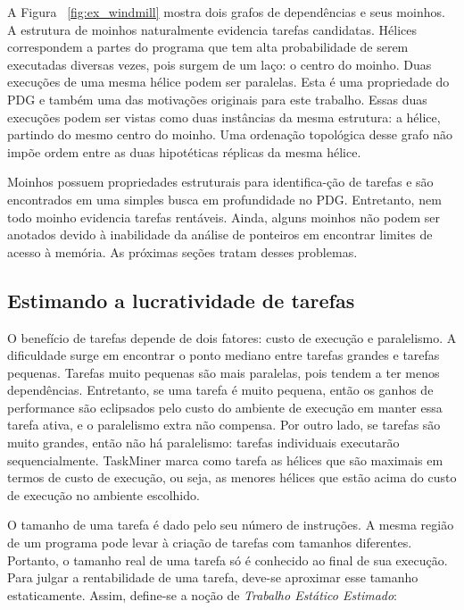\documentclass[sigconf]{acmart}
\newcommand\Taskminer{\mbox{\textsf{TaskMiner}}}
\begin{document}
A Figura ~\ref{fig:ex_windmill} mostra dois grafos de dependências e seus
moinhos. A estrutura de moinhos naturalmente evidencia tarefas candidatas.
Hélices correspondem a partes do programa que tem alta probabilidade de serem
executadas diversas vezes, pois surgem de um laço: o centro do moinho. Duas execuções
de uma mesma hélice podem ser paralelas. Esta é uma propriedade do PDG e também uma 
das motivações originais para este trabalho. Essas duas execuções podem ser vistas como duas instâncias
da mesma estrutura: a hélice, partindo do mesmo centro do moinho. 
Uma ordenação topológica desse grafo não impõe
ordem entre as duas hipotéticas réplicas da mesma hélice.

Moinhos possuem propriedades estruturais para identifica-\c{c}\~{a}o de tarefas e são encontrados
em uma simples busca em profundidade no PDG. Entretanto, nem todo moinho
evidencia tarefas rentáveis. Ainda, alguns moinhos não podem ser anotados devido à inabilidade 
da análise de ponteiros em encontrar limites de acesso à memória. As próximas seções tratam desses
problemas.

\subsection{Estimando a lucratividade de tarefas}
\label{sub:profit}

O benefício de tarefas depende de dois fatores: custo de execução e paralelismo.
A dificuldade surge em encontrar o ponto mediano entre tarefas grandes e tarefas pequenas.
Tarefas muito pequenas são mais paralelas, pois tendem a ter menos dependências. 
Entretanto, se uma tarefa é muito pequena, 
então os ganhos de performance são eclipsados pelo custo do ambiente de execução
em manter essa tarefa ativa, e o paralelismo extra não compensa.
Por outro lado, se tarefas são muito grandes, então não há paralelismo: 
tarefas individuais executarão sequencialmente.
{\Taskminer} marca como tarefa as hélices que são maximais 
em termos de custo de execução, ou seja, as menores hélices
que estão acima do custo de execução no ambiente escolhido.

O tamanho de uma tarefa é dado pelo seu número de instruções. A mesma região de um programa
pode levar à criação de tarefas com tamanhos diferentes. 
Portanto, o tamanho real de uma tarefa só é conhecido ao final 
de sua execução. Para julgar a rentabilidade de uma tarefa,
deve-se aproximar esse tamanho
estaticamente. Assim, define-se a noção de {\em Trabalho Estático Estimado}:
\end{document}
